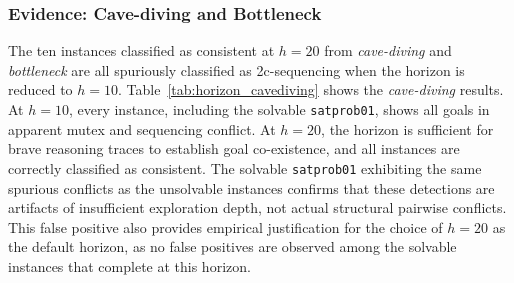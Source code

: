 \subsubsection{Evidence: Cave-diving and Bottleneck}

The ten instances classified as consistent at $h = 20$ from \textit{cave-diving} and \textit{bottleneck} are all spuriously classified as 2c-sequencing when the horizon is reduced to $h = 10$. Table~\ref{tab:horizon_cavediving} shows the \textit{cave-diving} results. At $h = 10$, every instance, including the solvable \texttt{satprob01}, shows all goals in apparent mutex and sequencing conflict. At $h = 20$, the horizon is sufficient for brave reasoning traces to establish goal co-existence, and all instances are correctly classified as consistent. The solvable \texttt{satprob01} exhibiting the same spurious conflicts as the unsolvable instances confirms that these detections are artifacts of insufficient exploration depth, not actual structural pairwise conflicts. This false positive also provides empirical justification for the choice of $h = 20$ as the default horizon, as no false positives are observed among the solvable instances that complete at this horizon.

